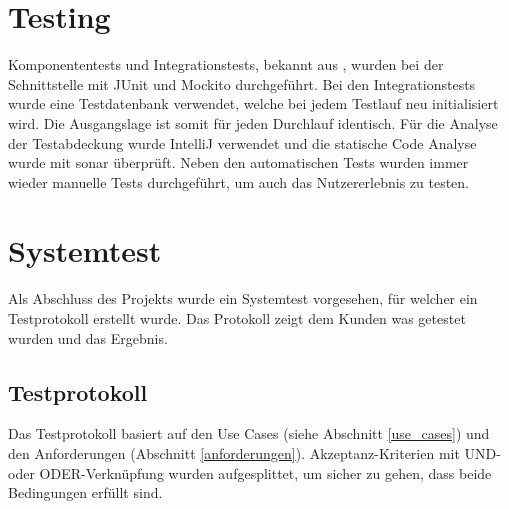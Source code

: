 \section{Testing}
Komponententests und Integrationstests, bekannt aus \cite{test_soft_book}, wurden bei der Schnittstelle mit JUnit und Mockito durchgeführt. Bei den Integrationstests wurde eine 
Testdatenbank verwendet, welche bei jedem Testlauf neu initialisiert wird. Die Ausgangslage ist somit für jeden Durchlauf identisch. Für die Analyse der Testabdeckung wurde IntelliJ 
verwendet und die statische Code Analyse wurde mit \gls{sonar} überprüft. Neben den automatischen Tests wurden immer wieder manuelle Tests durchgeführt, um auch das Nutzererlebnis 
zu testen.

\section{Systemtest}
Als Abschluss des Projekts wurde ein Systemtest vorgesehen, für welcher ein Testprotokoll erstellt wurde. Das Protokoll zeigt dem Kunden was getestet wurden und das Ergebnis.

\subsection{Testprotokoll}
Das Testprotokoll basiert auf den Use Cases (siehe Abschnitt \ref{use_cases}) und den Anforderungen (Abschnitt \ref{anforderungen}). Akzeptanz-Kriterien mit UND- oder ODER-Verknüpfung 
wurden aufgesplittet, um sicher zu gehen, dass beide Bedingungen erfüllt sind.

